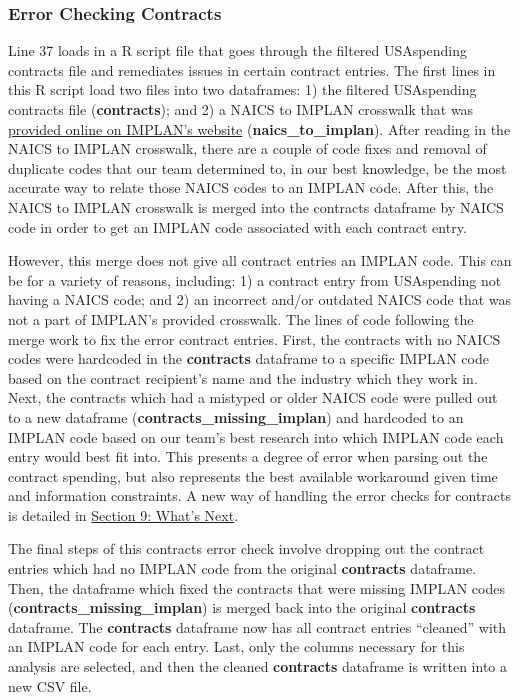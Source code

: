 \documentclass[
]{book}
\begin{document}
\hypertarget{error-checking-contracts}{%
\subsubsection{Error Checking Contracts}\label{error-checking-contracts}}

Line 37 loads in a R script file that goes through the filtered USAspending contracts file and remediates issues in certain contract entries. The first lines in this R script load two files into two dataframes: 1) the filtered USAspending contracts file (\textbf{contracts}); and 2) a NAICS to IMPLAN crosswalk that was \href{https://support.implan.com/hc/en-us/articles/360034896614-546-Industries-Conversions-Bridges-Construction-2018-Data}{provided online on IMPLAN's website} (\textbf{naics\_to\_implan}). After reading in the NAICS to IMPLAN crosswalk, there are a couple of code fixes and removal of duplicate codes that our team determined to, in our best knowledge, be the most accurate way to relate those NAICS codes to an IMPLAN code. After this, the NAICS to IMPLAN crosswalk is merged into the contracts dataframe by NAICS code in order to get an IMPLAN code associated with each contract entry.

However, this merge does not give all contract entries an IMPLAN code. This can be for a variety of reasons, including: 1) a contract entry from USAspending not having a NAICS code; and 2) an incorrect and/or outdated NAICS code that was not a part of IMPLAN's provided crosswalk. The lines of code following the merge work to fix the error contract entries. First, the contracts with no NAICS codes were hardcoded in the \textbf{contracts} dataframe to a specific IMPLAN code based on the contract recipient's name and the industry which they work in. Next, the contracts which had a mistyped or older NAICS code were pulled out to a new dataframe (\textbf{contracts\_missing\_implan}) and hardcoded to an IMPLAN code based on our team's best research into which IMPLAN code each entry would best fit into. This presents a degree of error when parsing out the contract spending, but also represents the best available workaround given time and information constraints. A new way of handling the error checks for contracts is detailed in \href{LINK\%20TO\%20SECTION\%209\%20OF\%20PROCESS\%20GUIDE}{Section 9: What's Next}.

The final steps of this contracts error check involve dropping out the contract entries which had no IMPLAN code from the original \textbf{contracts} dataframe. Then, the dataframe which fixed the contracts that were missing IMPLAN codes (\textbf{contracts\_missing\_implan}) is merged back into the original \textbf{contracts} dataframe. The \textbf{contracts} dataframe now has all contract entries ``cleaned'' with an IMPLAN code for each entry. Last, only the columns necessary for this analysis are selected, and then the cleaned \textbf{contracts} dataframe is written into a new CSV file.
\end{document}
